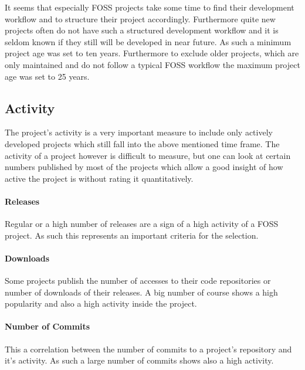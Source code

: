 It seems that especially \ac{FOSS} projects take some time to find their
development workflow and to structure their project accordingly. Furthermore
quite new projects often do not have such a structured development workflow and
it is seldom known if they still will be developed in near future. As such a
minimum project age was set to ten years. Furthermore to exclude older
projects, which are only maintained and do not follow a typical \ac{FOSS}
workflow the maximum project age was set to 25 years.


\subsection{Activity} %

The project's activity is a very important measure to include only actively
developed projects which still fall into the above mentioned time frame. The
activity of a project however is difficult to measure, but one can look at
certain numbers published by most of the projects which allow a good insight of
how active the project is without rating it quantitatively.

\paragraph{Releases} %

Regular or a high number of releases are a sign of a high activity of a
\ac{FOSS} project. As such this represents an important criteria for the
selection.


\paragraph{Downloads} %

Some projects publish the number of accesses to their code repositories or
number of downloads of their releases. A big number of course shows a high
popularity and also a high activity inside the project.


\paragraph{Number of Commits} %

This a correlation between the number of commits to a project's repository and
it's activity. As such a large number of commits shows also a high activity.

